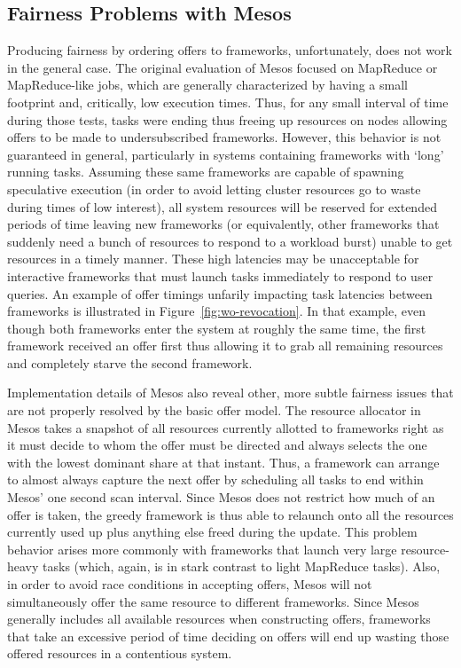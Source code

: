 \subsection{Fairness Problems with Mesos}
Producing fairness by ordering offers to frameworks, unfortunately, does not work in the
general case. The original evaluation of Mesos focused on MapReduce or MapReduce-like jobs,
which are generally characterized by having a small footprint and, critically, low execution
times. Thus, for any small interval of time during those tests, tasks were ending thus freeing
up resources on nodes allowing offers to be made to undersubscribed frameworks. However, this
behavior is not guaranteed in general, particularly in systems containing frameworks with
`long' running tasks. Assuming these same frameworks are capable of spawning speculative
execution (in order to avoid letting cluster resources go to waste during times of low
interest), all system resources will be reserved for extended periods of time leaving new
frameworks (or equivalently, other frameworks that suddenly need a bunch of resources to
respond to a workload burst) unable to get resources in a timely manner. These high latencies
may be unacceptable for interactive frameworks that must launch tasks immediately to respond to
user queries. An example of offer timings unfarily impacting task latencies between frameworks
is illustrated in Figure~\ref{fig:wo-revocation}. In that example, even though both frameworks
enter the system at roughly the same time, the first framework received an offer first thus
allowing it to grab all remaining resources and completely starve the second framework. 

Implementation details of Mesos also reveal other, more subtle fairness issues that are not
properly resolved by the basic offer model. The resource allocator in Mesos takes a snapshot of
all resources currently allotted to frameworks right as it must decide to whom the offer must
be directed and always selects the one with the lowest dominant share at that instant. Thus, a
framework can arrange to almost always capture the next offer by scheduling all tasks to end
within Mesos' one second scan interval. Since Mesos does not restrict how much of an offer is
taken, the greedy framework is thus able to relaunch onto all the resources currently used up
plus anything else freed during the update. This problem behavior arises more commonly with
frameworks that launch very large resource-heavy tasks (which, again, is in stark contrast to
light MapReduce tasks). Also, in order to avoid race conditions in accepting offers, Mesos will
not simultaneously offer the same resource to different frameworks. Since Mesos generally
includes all available resources when constructing offers, frameworks that take an excessive
period of time deciding on offers will end up wasting those offered resources in a contentious
system.

